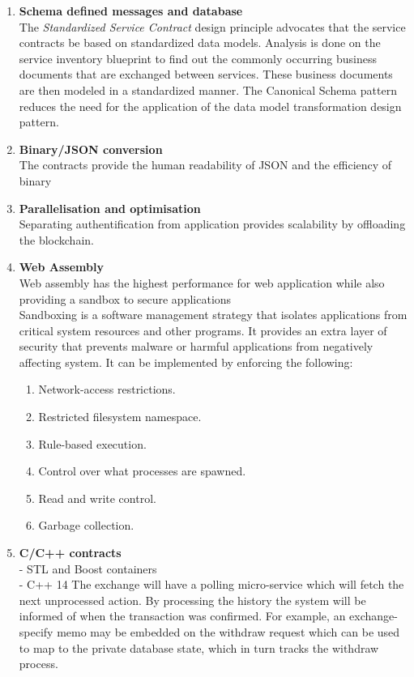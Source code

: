 \documentclass[]{article}
\begin{document}
	\begin{enumerate}
			\item \textbf{Schema defined messages and database} \\
			The \textit{Standardized Service Contract} design principle advocates that the service contracts be based on standardized data models. Analysis is done on the service inventory blueprint to find out the commonly occurring business documents that are exchanged between services. These business documents are then modeled in a standardized manner. The Canonical Schema pattern reduces the need for the application of the data model transformation design pattern.			
	
		\item\textbf{ Binary/JSON conversion} \\
		 The contracts provide the human readability of JSON and the efficiency of binary \\
	
		\item \textbf{Parallelisation and optimisation\\ } 
		Separating authentification from application provides scalability by offloading the blockchain.
	
	\item \textbf{Web Assembly}   \\
	Web assembly has the highest performance for web application while also providing a sandbox to secure applications\\
	Sandboxing is a software management strategy that isolates applications from
	critical system resources and other programs. 
	It provides an extra layer of security that prevents malware 
	or harmful applications from negatively affecting system.
	It can be implemented by enforcing the following:
	\begin{enumerate}
		\item Network-access restrictions.
		\item Restricted filesystem namespace.
		\item Rule-based execution. 
		\item Control over what processes are spawned.
		\item Read and write control.
		\item Garbage collection. 
	\end{enumerate}
	
	\item \textbf{C/C++ contracts\\}
	- STL and Boost containers\\
	- C++ 14
	The exchange will have a polling micro-service which will fetch the next unprocessed action.
	By processing the history the system will be informed of when the transaction was confirmed. For example, an exchange-specify memo may be embedded on the withdraw request which can be used to map to the private database state, which in turn tracks the withdraw process.	
	

\end{enumerate}
\end{document}
